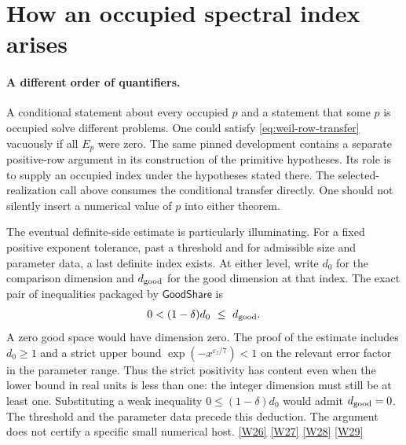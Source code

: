 \documentclass[12pt,letterpaper]{article}
\begin{document}
\section{How an occupied spectral index arises}
\label{sec:weil-seed}

\paragraph{A different order of quantifiers.}
A conditional statement about every occupied \(p\) and a statement that some \(p\) is occupied solve different problems. One could satisfy \eqref{eq:weil-row-transfer} vacuously if all \(E_p\) were zero. The same pinned development contains a separate positive-row argument in its construction of the primitive hypotheses. Its role is to supply an occupied index under the hypotheses stated there. The selected-realization call above consumes the conditional transfer directly. One should not silently insert a numerical value of \(p\) into either theorem.

The eventual definite-side estimate is particularly illuminating. For a fixed positive exponent tolerance, past a threshold and for admissible size and parameter data, a last definite index exists. At either level, write \(d_0\) for the comparison dimension and \(d_{\rm good}\) for the good dimension at that index. The exact pair of inequalities packaged by \(\mathsf{GoodShare}\) is
\[
       0<(1-\delta)d_0\ \leq\ d_{\rm good}.
\]
A zero good space would have dimension zero. The proof of the estimate includes \(d_0\ge1\) and a strict upper bound \(\exp(-x^{\varepsilon_z/7})<1\) on the relevant error factor in the parameter range. Thus the strict positivity has content even when the lower bound in real units is less than one: the integer dimension must still be at least one. Substituting a weak inequality \(0\le(1-\delta)d_0\) would admit \(d_{\rm good}=0\). The threshold and the parameter data precede this deduction. The argument does not certify a specific small numerical host. \href{https://github.com/nousentllc/riemann-hypothesis/blob/40e56bab026552e089d7afcfeff08d2defb9c005/src/Development/AutomorphicArithmetic/ThetaCorrespondence/ThetaPairLifts/LocalTypeDictionary/HoldsLOfTies.lean#L23-L49}{\textsf{[W26]}} \href{https://github.com/nousentllc/riemann-hypothesis/blob/40e56bab026552e089d7afcfeff08d2defb9c005/src/Development/AbelianVarietyTheory/Proofs/TwistedOperators/GoodFormsDefiniteExist.lean#L17-L40}{\textsf{[W27]}} \href{https://github.com/nousentllc/riemann-hypothesis/blob/40e56bab026552e089d7afcfeff08d2defb9c005/src/Development/AbelianVarietyTheory/BlockTheory/TwistedDiscreteSeries/DefiniteIndexDimensionCounts.lean#L47-L85}{\textsf{[W28]}} \href{https://github.com/nousentllc/riemann-hypothesis/blob/40e56bab026552e089d7afcfeff08d2defb9c005/src/Development/AbelianVarietyTheory/Proofs/TwistedOperators/IsNilpotentSubOneOfFullBlockUnipotent.lean#L398-L436}{\textsf{[W29]}}
\end{document}
